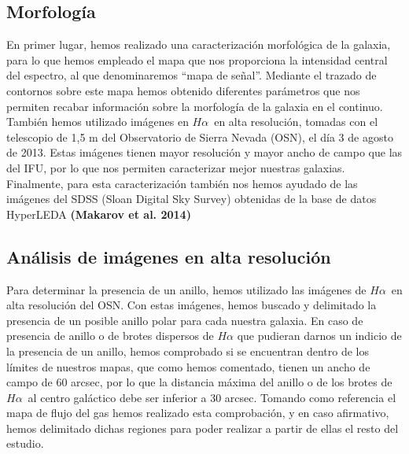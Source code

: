 \documentclass{article}
\newcommand{\hal}{$H\alpha$}
\begin{document}
\subsection{Morfología}
En primer lugar, hemos realizado una caracterización morfológica de la galaxia, para lo que hemos empleado el mapa que nos proporciona la intensidad central del espectro, al que denominaremos ``mapa de señal''. Mediante el trazado de contornos sobre este mapa hemos obtenido diferentes parámetros que nos permiten recabar información sobre la morfología de la galaxia en el continuo. También hemos utilizado imágenes en \hal\ en alta resolución, tomadas con el telescopio de 1,5 m del Observatorio de Sierra Nevada (OSN), el día 3 de agosto de 2013. Estas imágenes tienen mayor resolución y mayor ancho de campo que las del IFU, por lo que nos permiten caracterizar mejor nuestras galaxias. Finalmente, para esta caracterización también nos hemos ayudado de las imágenes del SDSS (Sloan Digital Sky Survey) obtenidas de la base de datos HyperLEDA \textbf{(Makarov et al. 2014)}

\subsection{Análisis de imágenes en alta resolución}
Para determinar la presencia de un anillo, hemos utilizado las imágenes de \hal\ en alta resolución del OSN. Con estas imágenes, hemos buscado y delimitado la presencia de un posible anillo polar para cada nuestra galaxia. En caso de presencia de anillo o de brotes dispersos de $H\alpha$ que pudieran darnos un indicio de la presencia de un anillo, hemos comprobado si se encuentran dentro de los límites de nuestros mapas, que como hemos comentado, tienen un ancho de campo de 60 arcsec, por lo que la distancia máxima del anillo o de los brotes de \hal\ al centro galáctico debe ser inferior a 30 arcsec. Tomando como referencia el mapa de flujo del gas hemos realizado esta comprobación, y en caso afirmativo, hemos delimitado dichas regiones para poder realizar a partir de ellas el resto del estudio.
\end{document}
